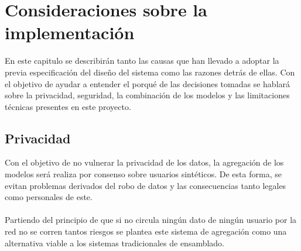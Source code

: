 \section{Consideraciones sobre la implementación}
En este capitulo se describirán tanto las causas que han llevado a adoptar la previa especificación del diseño del sistema como las razones detrás de ellas. Con el objetivo de ayudar a entender el porqué de las decisiones tomadas se hablará sobre la privacidad, seguridad, la combinación de los modelos y las limitaciones técnicas presentes en este proyecto.
\subsection{Privacidad}
Con el objetivo de no vulnerar la privacidad de los datos, la agregación de los modelos será realiza por consenso sobre usuarios sintéticos. De esta forma, se evitan problemas derivados del robo de datos y las consecuencias tanto legales como personales de este.
\\ \\
Partiendo del principio de que si no circula ningún dato de ningún usuario por la red no se corren tantos riesgos se plantea este sistema de agregación como una alternativa viable a los sistemas tradicionales de ensamblado.

